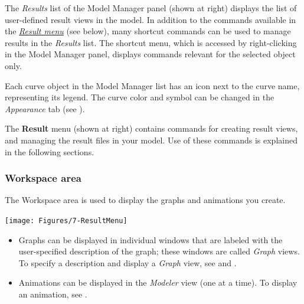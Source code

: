 The {\sl Results} list of the Model Manager panel (shown at right)
displays the list of user-defined result views in the model.
In addition to the commands available in the
\protect\hyperlink{result-menu}{\sl Result menu} (see below), many shortcut
commands can be used to manage results in the {\sl Results} list.
The shortcut menu, which is accessed by right-clicking in the Model Manager
panel, displays commands relevant for the selected object only.

Each curve object in the Model Manager  list
has an icon next to the curve name, \newline representing its legend.
The curve color and symbol \newline can be changed in the {\sl Appearance} tab
\newline(see ).

\bigskip\noindent
\begin{minipage}{0.5\textwidth}
  \raggedright

  The \textbf{Result} menu (shown at right) contains commands for creating
  result views, and managing the result files in your model.
  Use of these commands is explained in the following sections.

  \bigskip
  \subsubsection{Workspace area}

  The Workspace area is used to display the graphs and animations you create.
\end{minipage}%
\hfill\begin{minipage}{0.47\textwidth}
  \texttt{[image: Figures/7-ResultMenu]}
\end{minipage}

\begin{itemize}
\item
  Graphs can be displayed in individual windows that are labeled with the
  user-specified description of the graph; these windows are called {\sl Graph}
  views. To specify a description and display a {\sl Graph} view, see
   and
  .
\item
  Animations can be displayed in the {\sl Modeler} view (one at a time).
  To display an animation, see
  .
\end{itemize}


